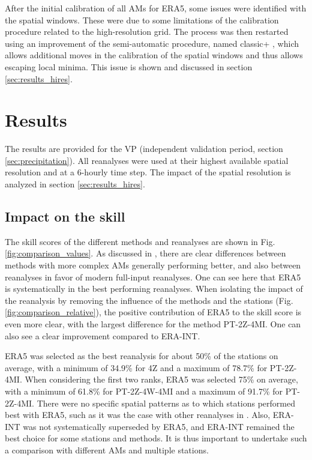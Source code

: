 \documentclass[alpha-refs]{wiley-article}
\begin{document}
After the initial calibration of all AMs for ERA5, some issues were identified with the spatial windows. These were due to some limitations of the calibration procedure related to the high-resolution grid. The process was then restarted using an improvement of the semi-automatic procedure, named classic+ \citep{Horton2019}, which allows additional moves in the calibration of the spatial windows and thus allows escaping local minima. This issue is shown and discussed in section \ref{sec:results_hires}.


\section{Results}
\label{sec:results}

The results are provided for the VP (independent validation period, section \ref{sec:precipitation}). All reanalyses were used at their highest available spatial resolution and at a 6-hourly time step. The impact of the spatial resolution is analyzed in section \ref{sec:results_hires}.

\subsection{Impact on the skill}
\label{sec:results_skill}

The skill scores of the different methods and reanalyses are shown in Fig. \ref{fig:comparison_values}. As discussed in \citet{Horton2018b}, there are clear differences between methods with more complex AMs generally performing better, and also between reanalyses in favor of modern full-input reanalyses. One can see here that ERA5 is systematically in the best performing reanalyses. When isolating the impact of the reanalysis by removing the influence of the methods and the stations (Fig. \ref{fig:comparison_relative}), the positive contribution of ERA5 to the skill score is even more clear, with the largest difference for the method PT-2Z-4MI. One can also see a clear improvement compared to ERA-INT.

ERA5 was selected as the best reanalysis for about 50\% of the stations on average, with a minimum of 34.9\% for 4Z and a maximum of 78.7\% for PT-2Z-4MI. When considering the first two ranks, ERA5 was selected 75\% on average, with a minimum of 61.8\% for PT-2Z-4W-4MI and a maximum of 91.7\% for PT-2Z-4MI. There were no specific spatial patterns as to which stations performed best with ERA5, such as it was the case with other reanalyses in \citet{Horton2018b}. Also, ERA-INT was not systematically superseded by ERA5, and ERA-INT remained the best choice for some stations and methods. It is thus important to undertake such a comparison with different AMs and multiple stations.
\end{document}
